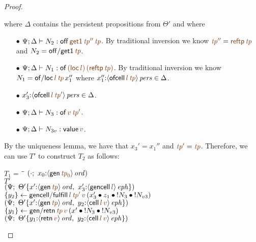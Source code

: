 \begin{proof}
\begin{description}
where $\Delta$ contains the persistent propositions from $\Theta'$ and where
\begin{itemize}
\item[$\bullet$] $\Psi; \Delta \vdash N_2 : {\sf off}\,\lf{{\sf get1}}\,\lf{{\it tp}''}\,\lf{{\it tp}}$. By traditional inversion we know $\lf{{\it tp}''} = \lf{{\sf reftp}\,{\it tp}}$ and $N_2 = {{\sf off/get1}\,\lf{\it tp}}$. 
\item[$\bullet$] $\Psi; \Delta \vdash N_1 : {\sf of}\,\lf{({\sf loc}\,l)}\,\lf{({\sf reftp}\,\lf{{\it tp}})}$. By traditional inversion we know $N_1 = {\sf of/loc}\,\lf{l}\,\lf{{\it tp}}\,x_1''$ where $x_1''{:}\ispers{\susp{{\sf ofcell}\,\lf{l}\,\lf{{\it tp}}}} \in \Delta$.
\item[$\bullet$] $x_3'{:}\ispers{\susp{{\sf ofcell}\,\lf{l}\,\lf{{\it tp}'}}} \in \Delta$.
\item[$\bullet$] $\Psi; \Delta \vdash N_3 : {\sf of}\,\lf{v}\,\lf{{\it tp}'}$.
\item[$\bullet$] $\Psi; \Delta \vdash N_{3v} : {\sf value}\,\lf{v}$.
\end{itemize}
By the uniqueness lemma, we have that $x_3' = x_1''$ and $\lf{{\it
    tp}'} = \lf{{\it tp}}$. Therefore, we can use $T'$ to construct $T_2$
as follows:

\begin{tabbing}
$T_1 = ~$ \= \qquad \= 
    $(\cdot; ~ x_0{:}\istrue{\susp{{\sf gen}\,\lf{{\it tp}_0}}})$
\\
\>$T'$
\\
\>\> $\left(\Psi; ~
       \tackon{\Theta'}
       {x'{:}\istrue{\susp{{\sf gen}\,\lf{{\it tp}}}}, ~
        x_3'{:}\iseph{\susp{{\sf gencell}\,\lf{l}}}
       }\right)$
\\
\>$\trstep{y_2}{{\sf gencell/fulfill}\,\lf{l}\,\lf{{\it tp}'}\,\lf{v}\,
      (\tfuser{x_3'}{\tfuser{z_1}{\tfuser{\tbangr{N_3}}{\tbangr{N_{v3}}}}})}$
\\
\>\> $\left(\Psi; ~
       \tackon{\Theta'}
       {x'{:}\istrue{\susp{{\sf gen}\,\lf{{\it tp}}}}, ~
        y_2{:}\iseph{\susp{{\sf cell}\,\lf{l}\,\lf{v}}}
       }\right)$
\\
\>$\trstep{y_1}{{\sf gen/retn}\,\lf{{\it tp}}\,\lf{v}\,
     (\tfuser{x'}{\tfuser{\tbangr{N_3}}{\tbangr{N_{v3}}}})}$
\\
\>\> $\left(\Psi; ~
       \tackon{\Theta'}
       {y_1{:}\istrue{\susp{{\sf retn}\,\lf{v}}}, ~
        y_2{:}\iseph{\susp{{\sf cell}\,\lf{l}\,\lf{v}}}
       }\right)$
\end{tabbing}


\end{description}
\end{proof}
